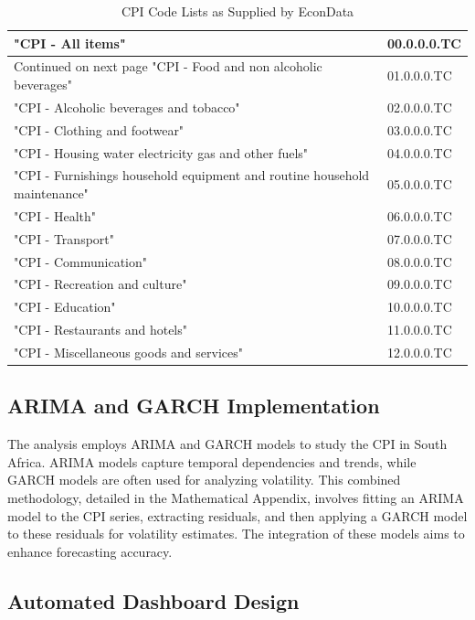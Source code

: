 \documentclass[11pt,preprint, authoryear]{elsarticle}
\numberwithin{equation}{section}
\numberwithin{figure}{section}
\numberwithin{table}{section}
\begin{document}
\begingroup\fontsize{12pt}{13pt}\selectfont
\begin{longtable}{ll}
\caption{CPI Code Lists as Supplied by EconData 
                \label{tab1}} \\ 
  \toprule
"CPI - All items" & 00.0.0.0.TC \\ 
  \hline 
\endhead 
\hline 
{\footnotesize Continued on next page} 
\endfoot 
\endlastfoot 
 \midrule
"CPI - Food and non alcoholic beverages" & 01.0.0.0.TC \\ 
  "CPI - Alcoholic beverages and tobacco" & 02.0.0.0.TC \\ 
  "CPI - Clothing and footwear" & 03.0.0.0.TC \\ 
  "CPI - Housing water electricity gas and other fuels" & 04.0.0.0.TC \\ 
  "CPI - Furnishings household equipment and routine household maintenance" & 05.0.0.0.TC \\ 
  "CPI - Health" & 06.0.0.0.TC \\ 
  "CPI - Transport" & 07.0.0.0.TC \\ 
  "CPI - Communication" & 08.0.0.0.TC \\ 
  "CPI - Recreation and culture" & 09.0.0.0.TC \\ 
  "CPI - Education" & 10.0.0.0.TC \\ 
  "CPI - Restaurants and hotels" & 11.0.0.0.TC \\ 
  "CPI - Miscellaneous goods and services" & 12.0.0.0.TC \\ 
   \bottomrule
\end{longtable}
\endgroup

\hypertarget{arima-and-garch-implementation}{%
\subsection{ARIMA and GARCH
Implementation}\label{arima-and-garch-implementation}}

The analysis employs ARIMA and GARCH models to study the CPI in South
Africa. ARIMA models capture temporal dependencies and trends, while
GARCH models are often used for analyzing volatility. This combined
methodology, detailed in the Mathematical Appendix, involves fitting an
ARIMA model to the CPI series, extracting residuals, and then applying a
GARCH model to these residuals for volatility estimates. The integration
of these models aims to enhance forecasting accuracy.

\hypertarget{automated-dashboard-design}{%
\subsection{Automated Dashboard
Design}\label{automated-dashboard-design}}
\end{document}
